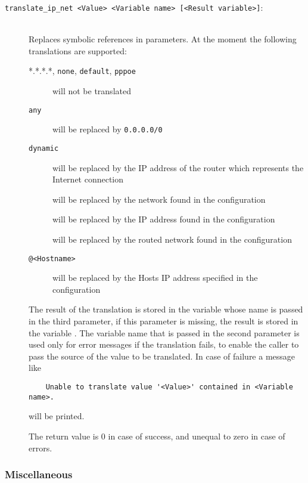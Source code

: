 \begin{description}

\item[\texttt{translate\_ip\_net <Value> <Variable name> [<Result variable>]}:]\mbox{}\\
Replaces symbolic references in parameters. At the moment the following translations
are supported:
\begin{description}
\item[*.*.*.*, \texttt{none}, \texttt{default}, \texttt{pppoe}] will not be translated
\item[\texttt{any}] will be replaced by \texttt{0.0.0.0/0}
\item[\texttt{dynamic}] will be replaced by the IP address of the router which represents
the Internet connection
\item[] will be replaced by the network found in the configuration
\item[] will be replaced by the IP address found in the configuration
\item[] will be replaced by the routed network found in the configuration
\item[\texttt{@<Hostname>}] will be replaced by the Hosts IP address specified in the configuration
\end{description}

The result of the translation is stored in the variable whose name is passed in the
third parameter, if this parameter is missing, the result is stored in the variable
. The variable name that is passed in the second parameter is used only
for error messages if the translation fails, to enable the caller to pass the source
of the value to be translated. In case of failure a message like

\begin{example}
\begin{verbatim}
    Unable to translate value '<Value>' contained in <Variable name>.
\end{verbatim}
\end{example}

will be printed.

The return value is 0 in case of success, and unequal to zero in case of errors.

\end{description}

\subsubsection{Miscellaneous}

